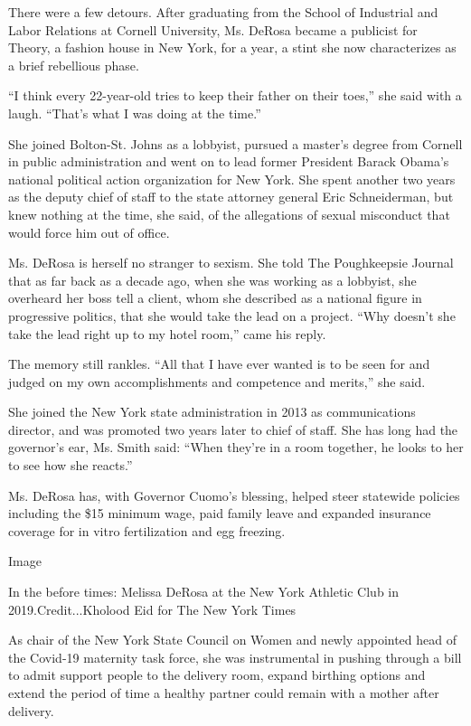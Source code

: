 There were a few detours. After graduating from the School of Industrial
and Labor Relations at Cornell University, Ms. DeRosa became a publicist
for Theory, a fashion house in New York, for a year, a stint she now
characterizes as a brief rebellious phase.

``I think every 22-year-old tries to keep their father on their toes,''
she said with a laugh. ``That's what I was doing at the time.''

She joined Bolton-St. Johns as a lobbyist, pursued a master's degree
from Cornell in public administration and went on to lead former
President Barack Obama's national political action organization for New
York. She spent another two years as the deputy chief of staff to the
state attorney general Eric Schneiderman, but knew nothing at the time,
she said, of the allegations of sexual misconduct that would force him
out of office.

Ms. DeRosa is herself no stranger to sexism. She told The Poughkeepsie
Journal that as far back as a decade ago, when she was working as a
lobbyist, she overheard her boss tell a client, whom she described as a
national figure in progressive politics, that she would take the lead on
a project. ``Why doesn't she take the lead right up to my hotel room,''
came his reply.

The memory still rankles. ``All that I have ever wanted is to be seen
for and judged on my own accomplishments and competence and merits,''
she said.

She joined the New York state administration in 2013 as communications
director, and was promoted two years later to chief of staff. She has
long had the governor's ear, Ms. Smith said: ``When they're in a room
together, he looks to her to see how she reacts.''

Ms. DeRosa has, with Governor Cuomo's blessing, helped steer statewide
policies including the \$15 minimum wage, paid family leave and expanded
insurance coverage for in vitro fertilization and egg freezing.

Image

In the before times: Melissa DeRosa at the New York Athletic Club in
2019.Credit...Kholood Eid for The New York Times

As chair of the New York State Council on Women and newly appointed head
of the Covid-19 maternity task force, she was instrumental in pushing
through a bill to admit support people to the delivery room, expand
birthing options and extend the period of time a healthy partner could
remain with a mother after delivery.

